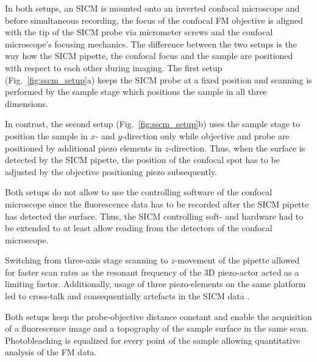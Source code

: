 In both setups, an SICM is mounted onto an inverted confocal microscope and
before simultaneous recording, the focus of the confocal FM objective is
aligned with the tip of the SICM probe via micrometer screws and the confocal
microscope's focusing mechanics. The
difference between the two setups is the way how the SICM pipette, the
confocal focus and the sample are positioned with respect to each other during
imaging. The
first setup (Fig.~\ref{fig:sscm_setup}a) keeps the 
SICM probe at a fixed position and scanning is performed by the sample
stage which positions the sample in all three dimensions.

In contrast, the second setup (Fig.~\ref{fig:sscm_setup}b) uses the sample
stage to position the sample in $x$- and $y$-direction only while objective
and probe are positioned by additional piezo elements in $z$-direction. Thus,
when the surface is detected by the SICM pipette,  the position of
the confocal spot has to be adjusted by the objective positioning piezo subsequently.

Both setups do not allow to use the controlling software of the confocal
microscope since the fluorescence data has to be recorded after the SICM
pipette has detected the surface. Thus, the SICM controlling soft- and
hardware had to be extended to at least allow reading from the detectors of
the confocal microscope. 

Switching from three-axis stage scanning to $z$-movement of the pipette
allowed for faster scan rates as the resonant frequency of the 3D
piezo-actor acted as a limiting factor. Additionally, usage of three
piezo-elements on the same platform led to cross-talk and consequentially
artefacts in the SICM data \cite{Shevchuk2013}.



Both setups keep the probe-objective distance constant and enable the
acquisition of a fluorescence image and a topography of the sample surface in
the same scan. Photobleaching is equalized for every point of the sample
allowing quantitative analysis of the FM data.

